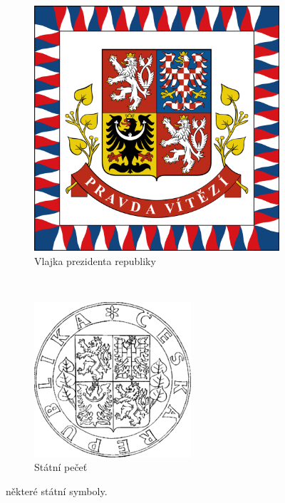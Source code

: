 \documentclass[10pt,a4paper,
twoside,%
]{report}
\begin{document}
\begin{figure}\centering
\begin{subfigure}{0.38\textwidth}
\includegraphics[width=\textwidth]{standarta}
\caption{Vlajka prezidenta republiky}
\label{fig:standarta}
\end{subfigure}~\hspace{0.5cm}\begin{subfigure}{0.38\textwidth}
\includegraphics[width=\textwidth]{pecet}
\caption{Státní pečeť}
\label{fig:pečeť}
\end{subfigure}
\caption{některé státní symboly.}
\end{figure}
\end{document}
